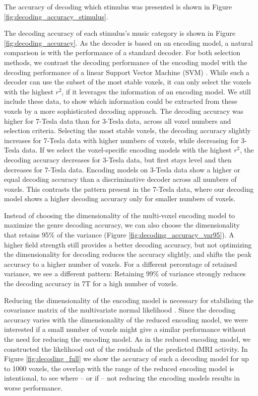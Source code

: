The accuracy of decoding which stimulus was presented
is shown in Figure \ref{fig:decoding_accuracy_stimulus}. %

The decoding accuracy of each stimulus's music category is shown in Figure
\ref{fig:decoding_accuracy}. As the decoder is based on an encoding model, a
natural comparison is with the performance of a standard decoder. For both
selection methods, we contrast the decoding performance of the encoding model
with the decoding performance of a linear Support Vector Machine (SVM)
\citep{FCH+08,V13}. While such a decoder can use the subset of the most stable
voxels, it can only select the voxels with the highest $r^2$, if it leverages
the information of an encoding model. We still include these data, to show
which information could be extracted from these voxels by a more sophisticated
decoding approach.  The decoding accuracy was higher for 7-Tesla data than for
3-Tesla data, across all voxel numbers and selection criteria.  Selecting the
most stable voxels, the decoding accuracy slightly increases for 7-Tesla data
with higher numbers of voxels, while decreasing for 3-Tesla data.  If we select
the voxel-specific encoding models with the highest $r^2$, the decoding
accuracy decreases for 3-Tesla data, but first stays level and then decreases
for 7-Tesla data. Encoding models on 3-Tesla data show a higher or equal
decoding accuracy than a discriminative decoder across all numbers of voxels.
This contrasts the pattern present in the 7-Tesla data, where our decoding
model shows a higher decoding accuracy only for smaller numbers of voxels.

Instead of choosing the dimensionality of the multi-voxel encoding model to
maximize the genre decoding accuracy, we can also choose the dimensionality that retains
95\% of the variance (Figure \ref{fig:decoding_accuracy_var95}). A higher field
strength still provides a better decoding accuracy, but not optimizing the
dimensionality for decoding reduces the accuracy slightly, and shifts the peak
accuracy to a higher number of voxels. For a different percentage of retained
variance, we see a different pattern: Retaining 99\% of variance strongly
reduces the decoding accuracy in 7T for a high number of voxels. 

Reducing the dimensionality of the encoding model is necessary for stabilising
the covariance matrix of the multivariate normal likelihood \citet{NG11}.  
Since the decoding accuracy varies with the dimensionality of the reduced
encoding model, we were interested if a small number of voxels might give a
similar performance without the need for reducing the encoding model. As in the
reduced encoding model, we constructed the likelihood out of the residuals of
the predicted f{MRI} activity. In Figure \ref{fig:decoding_full} we show the
accuracy of such a decoding model for up to 1000 voxels, the overlap with the
range of the reduced encoding model is intentional, to see where -- or if -- not
reducing the encoding models results in worse performance.

